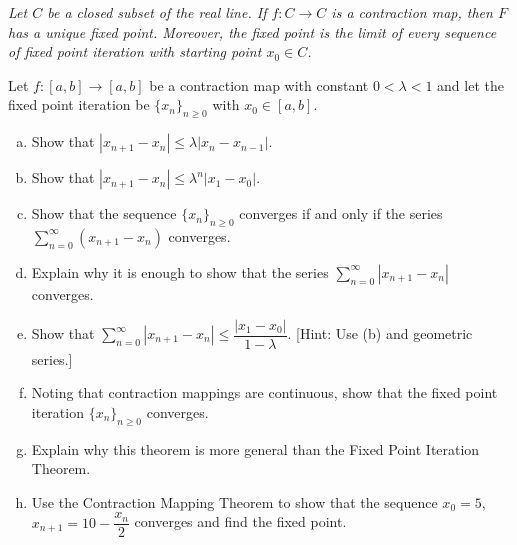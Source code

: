 \documentclass[11pt,letterpaper]{article}
\begin{document}
 {\itshape Let $C$ be a closed subset of the real line. If $f: C \to C$ is a contraction map, then $F$ has a unique fixed point. Moreover, the fixed point is the limit of every sequence of fixed point iteration with starting point $x_0 \in C$.} \pspace

\noindent Let $f: [a, b] \to [a, b]$ be a contraction map with constant $0 < \lambda < 1$ and let the fixed point iteration be $\{ x_n \}_{n \geq 0}$ with $x_0 \in [a, b]$.

        \begin{enumerate}[(a)]
        \item  Show that $|x_{n+1} - x_n| \leq \lambda |x_n - x_{n-1}|$.
        \item Show that $|x_{n+1} - x_n| \leq \lambda^n |x_1 - x_0|$.
        \item Show that the sequence $\{ x_n \}_{n \geq 0}$ converges if and only if the series $\displaystyle \sum_{n=0}^\infty (x_{n+1} - x_n)$ converges. 
        \item Explain why it is enough to show that the series $\displaystyle \sum_{n=0}^\infty |x_{n+1} - x_n|$ converges.
        \item Show that $\displaystyle \sum_{n=0}^\infty |x_{n+1} - x_n| \leq \dfrac{|x_1 - x_0|}{1 - \lambda}$. [Hint: Use (b) and geometric series.]
        \item Noting that contraction mappings are continuous, show that the fixed point iteration $\{ x_n \}_{n \geq 0}$ converges.
        \item Explain why this theorem is more general than the Fixed Point Iteration Theorem.
        \item Use the Contraction Mapping Theorem to show that the sequence $x_0= 5$, $x_{n+1}= 10 - \dfrac{x_n}{2}$ converges and find the fixed point. 
        \end{enumerate}



\newpage
\end{document}
